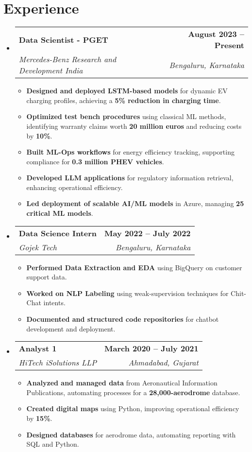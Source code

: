\documentclass[letterpaper,11pt]{article}
\makeatletter
\newcommand{\resumeItem}[1]{
  \item\small{
    {#1 \vspace{-2pt}}
  }
}
\newcommand{\resumeSubheading}[4]{
  \vspace{-2pt}\item
    \begin{tabular*}{1.0\textwidth}[t]{l@{\extracolsep{\fill}}r}
      \textbf{#1} & \textbf{\small #2} \\
      \textit{\small#3} & \textit{\small #4} \\
    \end{tabular*}\vspace{-7pt}
}
\newcommand{\resumeSubHeadingListStart}{\begin{itemize}[leftmargin=0.0in, label={}]}
\newcommand{\resumeSubHeadingListEnd}{\end{itemize}}
\newcommand{\resumeItemListStart}{\begin{itemize}}
\newcommand{\resumeItemListEnd}{\end{itemize}\vspace{-5pt}}
\makeatother
\begin{document}
\section{Experience}
 \resumeSubHeadingListStart
    \resumeSubheading
      {Data Scientist - PGET}{August 2023 -- Present}
      {Mercedes-Benz Research and Development India}{Bengaluru, Karnataka}
    \resumeItemListStart 
    \resumeItem{\textbf{Designed and deployed LSTM-based models} for dynamic EV charging profiles, achieving a \textbf{5\% reduction in charging time}.}
    \resumeItem{\textbf{Optimized test bench procedures} using classical ML methods, identifying warranty claims worth \textbf{20 million euros} and reducing costs by \textbf{10\%}.}
    \resumeItem{\textbf{Built ML-Ops workflows} for energy efficiency tracking, supporting compliance for \textbf{0.3 million PHEV vehicles}.}
    \resumeItem{\textbf{Developed LLM applications} for regulatory information retrieval, enhancing operational efficiency.}
    \resumeItem{\textbf{Led deployment of scalable AI/ML models} in Azure, managing \textbf{25 critical ML models}.}
    \resumeItemListEnd
    
    \resumeSubheading
        {Data Science Intern}{May 2022 -- July 2022}
        {Gojek Tech}{Bengaluru, Karnataka}
    \resumeItemListStart
    \resumeItem{\textbf{Performed Data Extraction and EDA} using BigQuery on customer support data.}
    \resumeItem{\textbf{Worked on NLP Labeling} using weak-supervision techniques for Chit-Chat intents.}
    \resumeItem{\textbf{Documented and structured code repositories} for chatbot development and deployment.}
    \resumeItemListEnd

    \resumeSubheading
      {Analyst 1}{March 2020 -- July 2021}
      {HiTech iSolutions LLP}{Ahmadabad, Gujarat}
      \resumeItemListStart
        \resumeItem{\textbf{Analyzed and managed data} from Aeronautical Information Publications, automating processes for a \textbf{28,000-aerodrome} database.}
        \resumeItem{\textbf{Created digital maps} using Python, improving operational efficiency by \textbf{15\%}.}
        \resumeItem{\textbf{Designed databases} for aerodrome data, automating reporting with SQL and Python.}
      \resumeItemListEnd  
 \resumeSubHeadingListEnd

\end{document}
